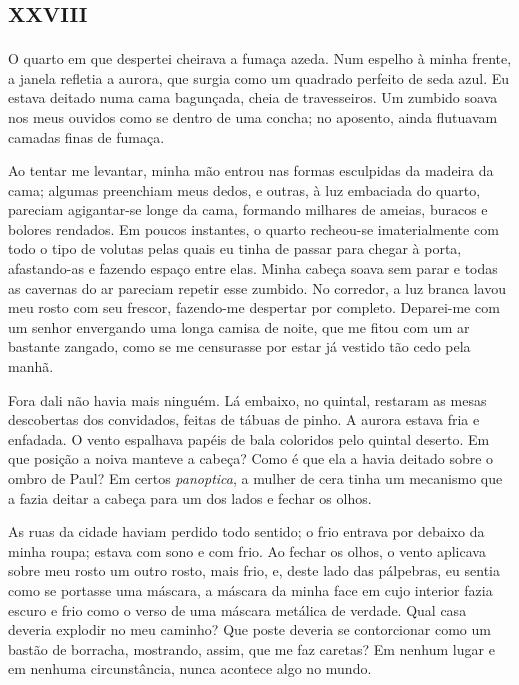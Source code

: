 \chapter*{\huge\centering\textsc{xxviii}}

O quarto em que despertei cheirava a fumaça azeda. Num espelho à minha frente, a janela refletia a aurora, que surgia como um quadrado perfeito de seda azul. Eu estava deitado numa cama bagunçada, cheia de travesseiros. Um zumbido soava nos meus ouvidos como se dentro de uma concha; no aposento, ainda flutuavam camadas finas de fumaça.

Ao tentar me levantar, minha mão entrou nas formas esculpidas da madeira da cama; algumas preenchiam meus dedos, e outras, à luz embaciada do quarto, pareciam agigantar-se longe da cama, formando milhares de ameias, buracos e bolores rendados. Em poucos instantes, o quarto recheou-se imaterialmente com todo o tipo de volutas pelas quais eu tinha de passar para chegar à porta, afastando-as e fazendo espaço entre elas. Minha cabeça soava sem parar e todas as cavernas do ar pareciam repetir esse zumbido. No corredor, a luz branca lavou meu rosto com seu frescor, fazendo-me despertar por completo. Deparei-me com um senhor envergando uma longa camisa de noite, que me fitou com um ar bastante zangado, como se me censurasse por estar já vestido tão cedo pela manhã.

Fora dali não havia mais ninguém. Lá embaixo, no quintal, restaram as mesas descobertas dos convidados, feitas de tábuas de pinho. A aurora estava fria e enfadada. O vento espalhava papéis de bala coloridos pelo quintal deserto. Em que posição a noiva manteve a cabeça? Como é que ela a havia deitado sobre o ombro de Paul? Em certos \textit{panoptica}, a mulher de cera tinha um mecanismo que a fazia deitar a cabeça para um dos lados e fechar os olhos.

As ruas da cidade haviam perdido todo sentido; o frio entrava por debaixo da minha roupa; estava com sono e com frio. Ao fechar os olhos, o vento aplicava sobre meu rosto um outro rosto, mais frio, e, deste lado das pálpebras, eu sentia como se portasse uma máscara, a máscara da minha face em cujo interior fazia escuro e frio como o verso de uma máscara metálica de verdade. Qual casa deveria explodir no meu caminho? Que poste deveria se contorcionar como um bastão de borracha, mostrando, assim, que me faz caretas? Em nenhum lugar e em nenhuma circunstância, nunca acontece algo no mundo.


